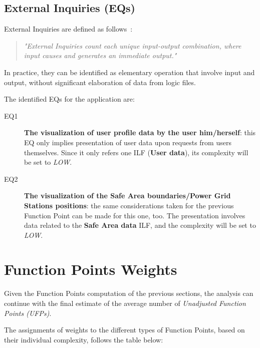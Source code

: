 \subsection{External Inquiries (EQs)}
External Inquiries are defined as follows~\cite{cocomo-manual}:
\begin{quotation}
\textit{"External Inquiries count each unique input-output combination, where input causes and generates an immediate output."}
\end{quotation}
In practice, they can be identified as elementary operation that involve input and output, without significant elaboration of data from logic files.

The identified EQs for the application are:
\begin{description}
\item[EQ1] \textbf{The visualization of user profile data by the user him/herself}: this EQ only implies presentation of user data upon requests from users themselves. Since it only refers one ILF (\textbf{User data}), its complexity will be set to \textit{LOW}.
\item[EQ2] \textbf{The visualization of the Safe Area boundaries/Power Grid Stations positions}: the same considerations taken for the previous Function Point can be made for this one, too. The presentation involves data related to the \textbf{Safe Area data} ILF, and the complexity will be set to \textit{LOW}.
\end{description}

\section{Function Points Weights}
Given the Function Points computation of the previous sections, the analysis can continue with the final estimate of the average number of \textit{Unadjusted Function Points (UFPs)}.

The assignments of weights to the different types of Function Points, based on their individual complexity, follows the table below:

